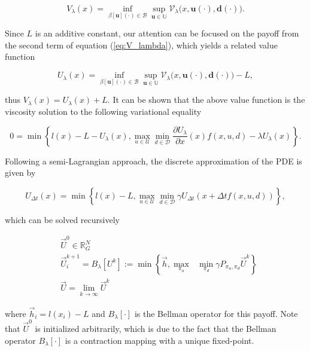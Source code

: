 \documentclass{journal}
\newcommand{\B}{\mathcal{B}}
\newcommand{\D}{\mathcal{D}}
\newcommand{\U}{\mathcal{U}}
\newcommand{\RR}{\mathbb{R}}
\newcommand{\UU}{\mathbb{U}}
\newcommand{\bu}{\bm{u}}
\newcommand{\bdelta}{\bm{d}}
\begin{document}
\begin{equation}
V_{\lambda}(x)=\inf_{\beta[\bu](\cdot) \in \B} \sup_{\bu \in \UU}\mathcal{V}_{\lambda}\big(x,\bu(\cdot),\bdelta(\cdot)\big).
\end{equation}


Since $L$ is an additive constant, our attention can be focused on the payoff from the second term of equation (\ref{eq:V_lambda}), which yields a related value function

\begin{equation}
U_{\lambda}(x)=\inf_{\beta[\bu](\cdot) \in \B} \sup_{\bu \in \UU}\mathcal{V}_{\lambda}\big(x,\bu(\cdot),\bdelta(\cdot)\big)-L, 
\end{equation}

\noindent thus $V_{\lambda}(x) = U_{\lambda}(x)+L$. It can be shown that the above value function is the viscosity solution to the following variational equality

\begin{equation}\label{eq:HJI_lambda}
    0 = \min\left\{l(x)-L-U_{\lambda}(x), \max_{u\in\U} \min_{ d\in\D} \!\!\frac{\partial U_{\lambda}}{\partial x}(x) f(x,u, d) - \lambda U_{\lambda}(x)\right\}.
\end{equation}

Following a semi-Lagrangian approach, the discrete approximation of the PDE is given by

\begin{equation}\label{eq:U_lambda_approx}
    U_{\Delta t} (x) = \min\left\{l(x)-L, \max_{u\in\U} \min_{ d\in\D}  \gamma U_{\Delta t}(x+\Delta tf(x,u,d))\right\},
\end{equation}

\noindent which can be solved recursively


\begin{subequations}\label{eq:dp_bellman_lambda}
\begin{align}
&\vec{U}^{0} \in \RR^N_G\\
&\vec{U}_{i}^{k+1} = B_\lambda[U^k] := \min\left\{ \vec{h}, \underset{\pi_u}{\max}\text{ }\underset{ \pi_d}{\min} \gamma P_{\pi_u, \pi_d} \vec{U}^k \right \}  \\
&\vec{U} = \lim_{k\rightarrow \infty} \vec{U}^{k}
\end{align}
\end{subequations}

\noindent where $\vec{h}_i = l(x_i)-L$ and $B_{\lambda}[\cdot]$ is the Bellman operator for this payoff. Note that $\vec{U}^{0}$ is initialized arbitrarily, which is due to the fact that the Bellman operator $B_{\lambda}[\cdot]$ is a contraction mapping with a unique fixed-point. 
\end{document}
